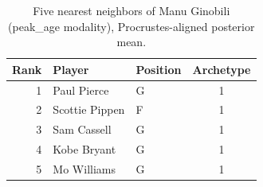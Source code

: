 \begin{table}[htbp]
  \centering\small
  \begin{tabular}{rllc}
    \toprule
    Rank & Player & Position & Archetype \\
    \midrule
    1 & Paul Pierce & G & 1 \\
    2 & Scottie Pippen & F & 1 \\
    3 & Sam Cassell & G & 1 \\
    4 & Kobe Bryant & G & 1 \\
    5 & Mo Williams & G & 1 \\
    \bottomrule
  \end{tabular}
  \caption{Five nearest neighbors of Manu Ginobili (peak_age modality), Procrustes-aligned posterior mean.}
  \label{tab:Manu_Ginobili_neighbors_peak_age}
\end{table}

